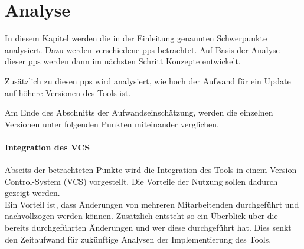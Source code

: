 \chapter{Analyse}
\label{cha:analyse}
In diesem Kapitel werden die in der Einleitung genannten Schwerpunkte analysiert.
Dazu werden verschiedene \glspl{pp} betrachtet. Auf Basis der Analyse dieser \glspl{pp} werden dann im nächsten Schritt Konzepte entwickelt.

Zusätzlich zu diesen \glspl{pp} wird analysiert, wie hoch der Aufwand für ein Update auf höhere Versionen des Tools ist. 

Am Ende des Abschnitts der Aufwandseinschätzung, werden die einzelnen Versionen unter folgenden Punkten miteinander verglichen.

\subsubsection{Integration des \ac{VCS}}
Abseits der betrachteten Punkte wird die Integration des Tools in einem Version-Control-System (\ac{VCS}) vorgestellt. Die Vorteile der Nutzung sollen dadurch gezeigt werden.\\
Ein Vorteil ist, dass Änderungen von mehreren Mitarbeitenden durchgeführt und nachvollzogen werden können. Zusätzlich entsteht so ein Überblick über die bereits durchgeführten Änderungen und wer diese durchgeführt hat. Dies senkt den Zeitaufwand für zukünftige Analysen der Implementierung des Tools.

\newpage
